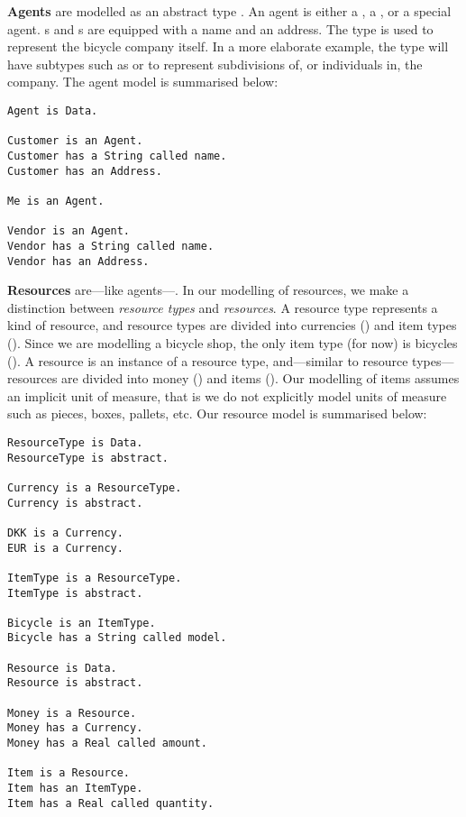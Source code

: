 \noindent\textbf{Agents} are modelled as an abstract type
. An agent is either a , a
, or a special 
agent. s and s are equipped
with a name and an address. The  type is used to
represent the bicycle company itself. In a more elaborate example, the
 type will have subtypes such as 
or  to represent subdivisions of, or
individuals in, the company. The agent model is summarised below:
\begin{lstlisting}[language=ontology,basicstyle=\small,multicols=2]
Agent is Data.

Customer is an Agent.
Customer has a String called name.
Customer has an Address.

Me is an Agent.

Vendor is an Agent.
Vendor has a String called name.
Vendor has an Address.
\end{lstlisting}
\vspace{-12pt}
\noindent\textbf{Resources} are---like
agents---. In our modelling of resources, we make a
distinction between \emph{resource types} and \emph{resources}. A
resource type represents a kind of resource, and resource types are
divided into currencies () and item types
(). Since we are modelling a bicycle shop, the
only item type (for now) is bicycles (). A
resource is an instance of a resource type, and---similar to resource
types---resources are divided into money () and
items (). Our modelling of items assumes an implicit
unit of measure, that is we do not explicitly model units of measure
such as pieces, boxes, pallets, etc.  Our resource model is summarised
below:
\begin{lstlisting}[language=ontology,basicstyle=\small,multicols=2]
ResourceType is Data.
ResourceType is abstract.

Currency is a ResourceType.
Currency is abstract.

DKK is a Currency.
EUR is a Currency.

ItemType is a ResourceType.
ItemType is abstract.

Bicycle is an ItemType.
Bicycle has a String called model.

Resource is Data.
Resource is abstract.

Money is a Resource.
Money has a Currency.
Money has a Real called amount.

Item is a Resource.
Item has an ItemType.
Item has a Real called quantity.  
\end{lstlisting}

